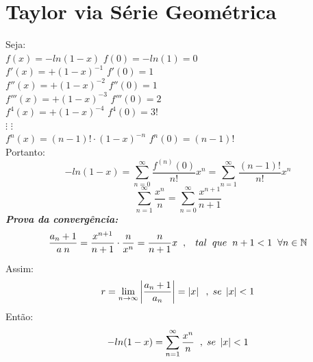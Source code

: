 \documentclass[12pt]{article}
\begin{document}
\section{Taylor via Série Geométrica}
Seja:\\
\(f(x)=-ln(1-x)\) \hspace{3cm} \(f(0)=-ln(1)=0\)\\ 
\(f'(x)=+(1-x)^{-1}\) \hspace{2.85cm} \(f'(0)=1\)\\ 
\(f''(x)=+(1-x)^{-2}\) \hspace{2.75cm} \(f''(0)=1\)\\
\(f'''(x)=+(1-x)^{-3}\) \hspace{2.65cm} \(f'''(0)=2\)\\
\(f^{4}(x)=+(1-x)^{-4}\) \hspace{2.7cm} \(f^{4}(0)=3!\)\\
\(\vdots\) \hspace{6.2cm} \(\vdots\)\\
\(f^{n}(x)=(n-1)!\cdot(1-x)^{-n}\) \hspace{1.2cm} \(f^{n}(0)=(n-1)!\)
\vspace{1cm}\\
Portanto:
\[-ln(1-x)=\sum_{n=0}^{\infty}\frac{f^{(n)}(0)}{n!}x^n=\sum_{n=1}^{\infty}\frac{(n-1)!}{n!}x^n\]
\[\sum_{n=1}^{\infty}\frac{x^n}{n}=\sum_{n=0}^{\infty}\frac{x^{n+1}}{n+1}\]
\textbf{\textit{Prova da convergência:}}
\[\frac{{a_{n}}+1}{{a\frac{}{}{n}}}=\frac{x^{n+1}}{n+1}\cdot\frac{n}{x^n}=\frac{n}{n+1}x\hspace{0.2cm},\hspace{0.3cm}tal\hspace{0.2cm}que\hspace{0.2cm}n+1<1\hspace{0.2cm}\forall n\in\mathbb{N}\]
Assim:
\[r=\displaystyle\lim_{n\to\infty}\left|\frac{{a_{n}}+1}{{a_{n}}}\right|=\left|x\right|\hspace{0.2cm},\hspace{0.1cm}se\hspace{0.1cm}\left|x\right|<1\]
Então:
\[-ln(1-x)=\sum_{n=1}^{\infty}\frac{x^n}{n}\hspace{0.2cm},\hspace{0.1cm}se\hspace{0.1cm}\left|x\right|<1\]
\end{document}
